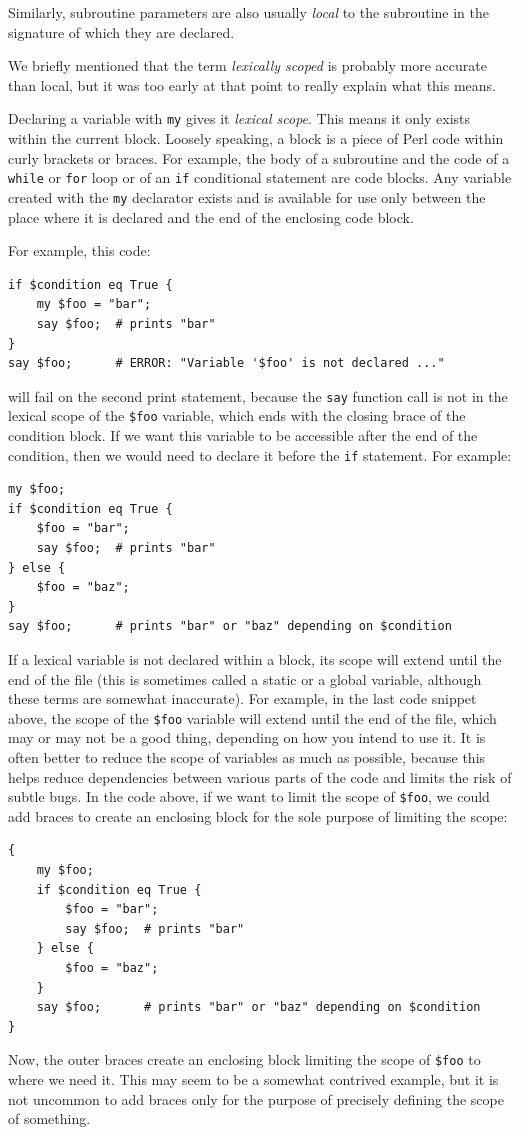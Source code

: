 Similarly, subroutine 
parameters are also usually \emph{local} to the subroutine 
in the signature of which they are declared.

We briefly mentioned that the term \emph{lexically scoped} 
is probably more accurate than local, but it was 
too early at that point to really explain what this means.

Declaring a variable with {\tt my} gives it \emph{lexical 
scope}. This means it only exists within the current block. 
Loosely speaking, a 
block is a piece of Perl code within curly brackets or 
braces. For example, the body of a subroutine and the code of a 
{\tt while} or {\tt for} loop or of an {\tt if} conditional
statement are code blocks. Any variable created with the 
{\tt my} declarator exists and is available for use only 
between the place where it is declared and the end of the 
enclosing code block.

For example, this code:

\begin{verbatim}
if $condition eq True {
    my $foo = "bar";
    say $foo;  # prints "bar"
}
say $foo;      # ERROR: "Variable '$foo' is not declared ..."
\end{verbatim}
%
will fail on the second print statement, because the \verb'say' 
function call is not in 
the lexical scope of the {\tt \$foo} variable, which ends 
with the closing brace of the condition block. If we want 
this variable to be accessible after the end of the condition, 
then we would need to declare it before the {\tt if} statement. 
For example:

\begin{verbatim}
my $foo;
if $condition eq True {
    $foo = "bar";
    say $foo;  # prints "bar"
} else {
    $foo = "baz";
}
say $foo;      # prints "bar" or "baz" depending on $condition
\end{verbatim}
%
If a lexical variable is not declared within a block, its 
scope will extend until the end of the file (this is sometimes 
called a static or a global variable, although these terms are 
somewhat inaccurate). For example, in the last code snippet 
above, the scope of the {\tt \$foo} variable will extend 
until the end of the file, which may or may not be a good thing, 
depending on how you intend to use it. It 
is often better to reduce the scope of variables as much as 
possible, because this helps reduce dependencies between 
various parts of the code and limits 
the risk of subtle bugs. In the code above, if we want to 
limit the scope of {\tt \$foo}, we could add braces to create 
an enclosing block for the sole purpose of limiting the scope:
\begin{verbatim}
{
    my $foo;
    if $condition eq True {
        $foo = "bar";
        say $foo;  # prints "bar"
    } else {
        $foo = "baz";
    }
    say $foo;      # prints "bar" or "baz" depending on $condition
}
\end{verbatim}
% 
Now, the outer braces create an enclosing block limiting the 
scope of {\tt \$foo} to where we need it. This may seem to be a 
somewhat contrived example, but it is not uncommon to add 
braces only for the purpose of precisely defining the scope 
of something.

